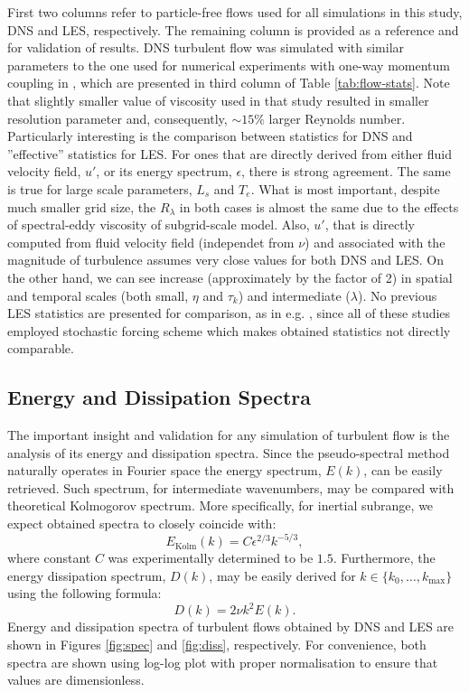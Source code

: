 \documentclass{pracamgren}
\begin{document}
First two columns refer to particle-free flows used for all simulations in this study, DNS and LES, respectively.
The remaining column is provided as a reference and for validation of results.
DNS turbulent flow was simulated with similar parameters to the one used for numerical experiments with one-way momentum coupling in \textcite[Table 1, entry for $256^3$]{Rosa2013}, which are presented in third column of Table \ref{tab:flow-stats}.
Note that slightly smaller value of viscosity used in that study resulted in smaller resolution parameter and, consequently, $\sim 15\%$ larger Reynolds number.
Particularly interesting is the comparison between statistics for DNS and ''effective'' statistics for LES.
For ones that are directly derived from either fluid velocity field, $u'$, or its energy spectrum, $\epsilon$, there is strong agreement.
The same is true for large scale parameters, $L_s$ and $T_e$.
What is most important, despite much smaller grid size, the $R_{\lambda}$ in both cases is almost the same due to the effects of spectral-eddy viscosity of subgrid-scale model.
Also, $u'$, that is directly computed from fluid velocity field (independet from $\nu$) and associated with the magnitude of turbulence assumes very close values for both DNS and LES.  
On the other hand, we can see increase (approximately by the factor of 2) in spatial and temporal scales (both small, $\eta$ and $\tau_k$) and intermediate ($\lambda$).
No previous LES statistics are presented for comparison, as in e.g. \textcite[Table 1 therein]{Rosa2017}, since all of these studies employed stochastic forcing scheme which makes obtained statistics not directly comparable.

\subsection{Energy and Dissipation Spectra}
\label{ssc:ch2.flow.spec}

The important insight and validation for any simulation of turbulent flow is the analysis of its energy and dissipation spectra.
Since the pseudo-spectral method naturally operates in Fourier space the energy spectrum, $E(k)$, can be easily retrieved.
Such spectrum, for intermediate wavenumbers, may be compared with theoretical Kolmogorov spectrum.
More specifically, for inertial subrange, we expect obtained spectra to closely coincide with:
\begin{equation}
E_{\text{Kolm}}(k) = C \epsilon^{2/3} k^{-5/3} ,
\label{eqn:kolm}
\end{equation}
where constant $C$ was experimentally determined to be $1.5$. 
Furthermore, the energy dissipation spectrum, $D(k)$, may be easily derived for $k \in \{ k_{0}, \ldots, k_{\max} \}$ using the following formula:
$$ D(k) = 2 \nu k^{2} E(k) . $$
Energy and dissipation spectra of turbulent flows obtained by DNS and LES are shown in Figures \ref{fig:spec} and \ref{fig:diss}, respectively.
For convenience, both spectra are shown using log-log plot with proper normalisation to ensure that values are dimensionless.
\end{document}
